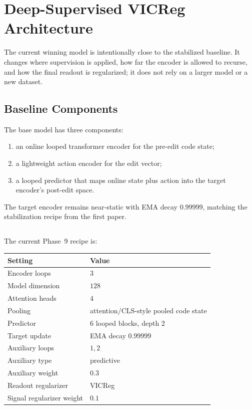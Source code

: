 \section{Deep-Supervised VICReg Architecture}
\label{sec:architecture}

The current winning model is intentionally close to the stabilized
\CodeWM{} baseline.  It changes where supervision is applied, how far
the encoder is allowed to recurse, and how the final readout is
regularized; it does not rely on a larger model or a new dataset.

\subsection{Baseline Components}

The base model has three components:
\begin{enumerate}
    \item an online looped transformer encoder for the pre-edit code
          state;
    \item a lightweight action encoder for the edit vector;
    \item a looped predictor that maps online state plus action into the
          target encoder's post-edit space.
\end{enumerate}
The target encoder remains near-static with EMA decay $0.99999$, matching
the stabilization recipe from the first paper.

\subsection{}

The current Phase~9 recipe is:
\begin{center}
\begin{tabular}{ll}
\toprule
Setting & Value \\
\midrule
Encoder loops & $3$ \\
Model dimension & $128$ \\
Attention heads & $4$ \\
Pooling & attention/CLS-style pooled code state \\
Predictor & 6 looped blocks, depth 2 \\
Target update & EMA decay $0.99999$ \\
Auxiliary loops & $1,2$ \\
Auxiliary type & predictive \\
Auxiliary weight & $0.3$ \\
Readout regularizer & VICReg \\
Signal regularizer weight & $0.1$ \\
\bottomrule
\end{tabular}
\end{center}

